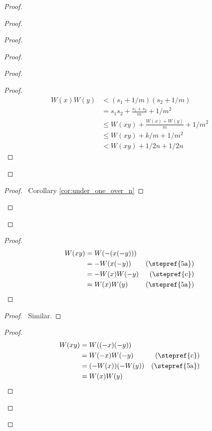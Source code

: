 \documentclass{article}
\let\qed\relax
\theoremstyle{definition}
\begin{document}
\begin{proof}
\begin{proof}
\begin{proof}
\begin{proof}
\begin{proof}
                        \begin{proof}
                            \pf
                            \begin{align*}
                                W(x) W(y) & < (s_1 + 1/m) (s_2 + 1/m) \\
                                & = s_1 s_2 + \frac{s_1 + s_2}{m} + 1/m^2 \\
                                & \leq W(xy) + \frac{W(x) + W(y)}{m} + 1/m^2 \\
                                & \leq W(xy) + k/m + 1/m^2 \\
                                & < W(xy) + 1/2n + 1/2n
                            \end{align*}
                        \end{proof}
                    \end{proof}
                    \begin{proof}
                        \pf\ Corollary \ref{cor:under_one_over_n}
                    \end{proof}
                \end{proof}
            \end{proof}
            \begin{proof}
                \pf
                \begin{align*}
                    W(xy) & = W(-(x(-y))) \\
                    & = -W(x(-y)) & (\text{\stepref{5a}}) \\
                    & = -W(x)W(-y) & (\text{\stepref{c}}) \\
                    & = W(x)W(y) & (\text{\stepref{5a}})
                \end{align*}
            \end{proof}
            \begin{proof}
                \pf\ Similar.
            \end{proof}
            \begin{proof}
                \pf
                \begin{align*}
                    W(xy) & = W((-x)(-y)) \\
                    & = W(-x) W(-y) & (\text{\stepref{c}}) \\
                    & = (-W(x)) (-W(y)) & (\text{\stepref{5a}})\\
                    & = W(x) W(y)
                \end{align*}
            \end{proof}
        \end{proof}
        \qed
    \end{proof}
\end{document}
